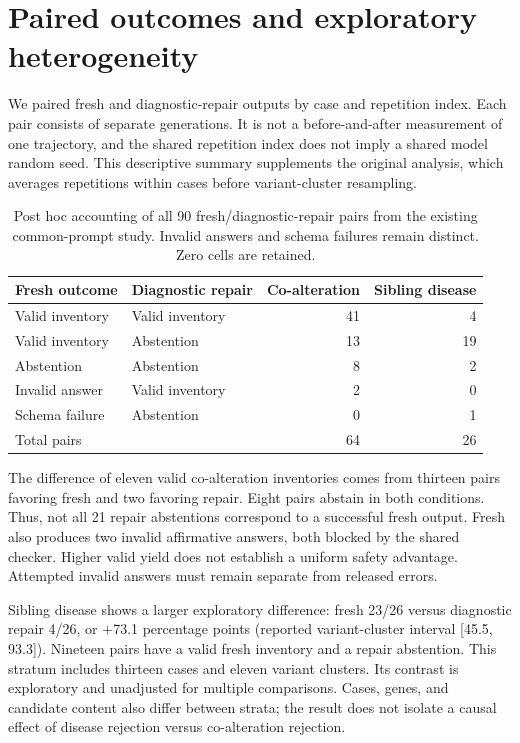 \documentclass[11pt]{article}
\begin{document}
\section{Paired outcomes and exploratory heterogeneity}

We paired fresh and diagnostic-repair outputs by case and repetition index. Each
pair consists of separate generations. It is not a before-and-after measurement
of one trajectory, and the shared repetition index does not imply a shared model
random seed. This descriptive summary supplements the original analysis, which
averages repetitions within cases before variant-cluster resampling.

\begin{table}[h!]
\centering\small
\caption{Post hoc accounting of all 90 fresh/diagnostic-repair pairs from the existing common-prompt study. Invalid answers and schema failures remain distinct. Zero cells are retained.}
\begin{tabular}{@{}llrr@{}}
\toprule
Fresh outcome & Diagnostic repair & Co-alteration & Sibling disease\\
\midrule
Valid inventory & Valid inventory & 41 & 4\\
Valid inventory & Abstention & 13 & 19\\
Abstention & Abstention & 8 & 2\\
Invalid answer & Valid inventory & 2 & 0\\
Schema failure & Abstention & 0 & 1\\
\midrule
Total pairs & & 64 & 26\\
\bottomrule
\end{tabular}
\end{table}

The difference of eleven valid co-alteration inventories comes from thirteen
pairs favoring fresh and two favoring repair. Eight pairs abstain in both
conditions. Thus, not all 21 repair abstentions correspond to a successful fresh
output. Fresh also produces two invalid affirmative answers, both blocked by the
shared checker. Higher valid yield does not establish a uniform safety
advantage. Attempted invalid answers must remain separate from released errors.

Sibling disease shows a larger exploratory difference: fresh 23/26 versus
diagnostic repair 4/26, or +73.1 percentage points (reported variant-cluster
interval [45.5, 93.3]). Nineteen pairs have a valid fresh inventory and a repair
abstention. This stratum includes thirteen cases and eleven variant clusters.
Its contrast is exploratory and unadjusted for multiple comparisons. Cases,
genes, and candidate content also differ between strata; the result does not
isolate a causal effect of disease rejection versus co-alteration rejection.
\end{document}
